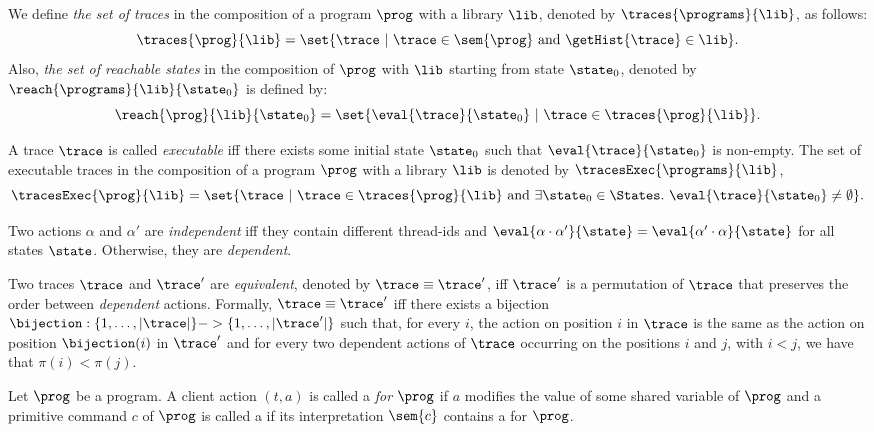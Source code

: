 We define \emph{the set of traces} in the composition of a program $\prog$ with a library $\lib$, denoted by $\traces{\programs}{\lib}$, as follows:
\[
\traces{\prog}{\lib} =
\set{\trace\ |\ \trace \in \sem{\prog} \mbox{ and }
  \getHist{\trace} \in \lib}.
\]
Also, \emph{the set of reachable states} in the composition of $\prog$ with $\lib$ starting from state $\state_0$, denoted by $\reach{\programs}{\lib}{\state_0}$ is defined by:
\[
\reach{\prog}{\lib}{\state_0} =
\set{\eval{\trace}{\state_0}\ |\ \trace \in \traces{\prog}{\lib}}.
\]

A trace $\trace$ is called \emph{executable} iff there exists some initial state $\state_0$ such that $\eval{\trace}{\state_0}$ is non-empty. The set of executable traces in the composition of a program $\prog$ with a library $\lib$ is denoted by $\tracesExec{\programs}{\lib}$, \ie
\[
\tracesExec{\prog}{\lib} =
\set{\trace\ |\ \trace \in \traces{\prog}{\lib} \mbox{ and }
  \exists \state_0\in\States.\ \eval{\trace}{\state_0}\neq\emptyset}.
\]

Two actions $\alpha$ and $\alpha'$ are \emph{independent} iff they contain different thread-ids and $\eval{\alpha\cdot\alpha'}{\state}=\eval{\alpha'\cdot\alpha}{\state}$ for all states $\state$. Otherwise, they are \emph{dependent}.

Two traces $\trace$ and $\trace'$ are \emph{equivalent}, denoted by $\trace\equiv\trace'$, iff $\trace'$ is a permutation of $\trace$ that preserves the order between \emph{dependent} actions.
Formally, $\trace\equiv\trace'$ iff there exists a bijection $\bijection:\{1,\ldots,|\trace|\}->\{1,\ldots,|\trace'|\}$ such that, for every $i$, the action on position $i$ in $\trace$ is the same as the action on position $\bijection(i)$ in $\trace'$ and for every two dependent actions of $\trace$ occurring on the positions $i$ and $j$, with $i<j$, we have that $\pi(i)<\pi(j)$.


Let $\prog$ be a program.
A client action $(t,a)$ is called a \emph{{\shwrite} for $\prog$} if $a$ modifies the value of some shared variable of $\prog$ and 
a primitive command $c$ of $\prog$ is called a \emph{\shwrite} if its interpretation $\sem{c}$ contains a {\shwrite} for $\prog$. %


